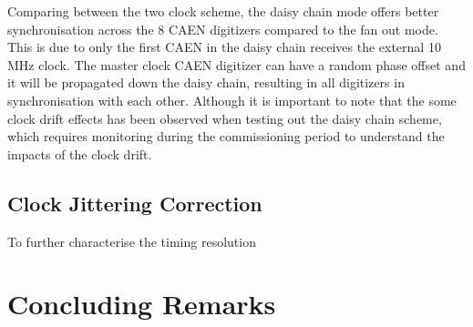 Comparing between the two clock scheme, the daisy chain mode offers better synchronisation across the 8 CAEN digitizers compared to the fan out mode.
This is due to only the first CAEN in the daisy chain receives the external 10 MHz clock.
The master clock CAEN digitizer can have a random phase offset and it will be propagated down the daisy chain, resulting in all digitizers in synchronisation with each other.
Although it is important to note that the some clock drift effects has been observed when testing out the daisy chain scheme, which requires monitoring during the commissioning period to understand the impacts of the clock drift.

\subsection{Clock Jittering Correction}

To further characterise the timing resolution 




\section{Concluding Remarks}
\label{section5.5}
